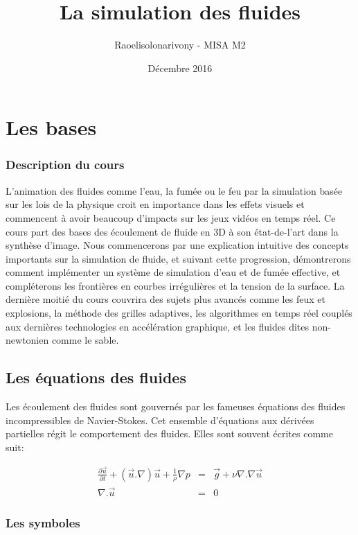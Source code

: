 \documentclass[11pt]{report}
\title{La simulation des fluides}
\author{Raoelisolonarivony - MISA M2}
\date{Décembre 2016}
\begin{document}
\maketitle
\part{Les bases}

\section*{Description du cours}

L'animation des fluides comme l'eau, la fumée ou le feu par la simulation basée sur les lois de la physique croit en importance dans les effets visuels et commencent à avoir beaucoup d'impacts sur les jeux vidéos en temps réel. Ce cours part des bases des écoulement de fluide en 3D à son état-de-l'art dans la synthèse d'image. Nous commencerons par une explication intuitive des concepts importants sur la simulation de fluide, et suivant cette progression, démontrerons comment implémenter un système de simulation d'eau et de fumée effective, et compléterons les frontières en courbes irrégulières et  la tension de la surface. La dernière moitié du cours couvrira des sujets plus avancés comme les feux et explosions, la méthode des grilles adaptives, les algorithmes en temps réel couplés aux dernières technologies en accélération graphique, et les fluides dites non-newtonien comme le sable. 

\chapter{Les équations des fluides}
Les écoulement des fluides sont gouvernés par les fameuses équations des fluides incompressibles de Navier-Stokes. Cet ensemble d'équations aux dérivées partielles régit le comportement des fluides. Elles sont souvent écrites comme suit:

\begin{eqnarray}
\frac{\partial \overrightarrow{u}}{\partial t} + (\overrightarrow{u} . \nabla ) \overrightarrow{u} + \frac{1}{\rho} \nabla p & = & \overrightarrow{g} + \nu \nabla . \nabla \overrightarrow{u} \\
\nabla . \overrightarrow{u} & = & 0
\end{eqnarray}

\section{Les symboles}
\end{document}
